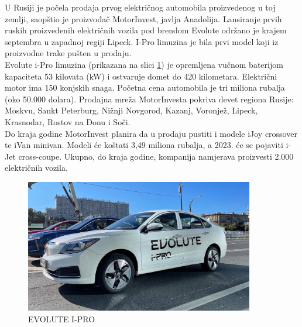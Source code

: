 \documentclass[a4paper]{article}
\begin{document}
    U Rusiji je počela prodaja prvog električnog automobila proizvedenog u toj zemlji, saopštio je proizvođač MotorInvest, javlja Anadolija. Lansiranje prvih ruskih proizvedenih električnih vozila pod brendom Evolute održano je krajem septembra u zapadnoj regiji Lipeck. I-Pro limuzina je bila prvi model koji iz proizvodne trake pušten u prodaju.\\
    Evolute i-Pro limuzina (prikazana na slici \ref{fig:IMG_EVOLUTE}) je opremljena vučnom baterijom kapaciteta 53 kilovata (kW) i ostvaruje domet do 420 kilometara. Električni motor ima 150 konjskih snaga.
    Početna cena automobila je tri miliona rubalja (oko 50.000 dolara). Prodajna mreža MotorInvesta pokriva devet regiona Rusije: Moskvu, Sankt Peterburg, Nižnji Novgorod, Kazanj, Voronjež, Lipeck, Krasnodar, Rostov na Donu i Soči.\\
    Do kraja godine MotorInvest planira da u prodaju pustiti i modele iJoy crossover te iVan minivan. Modeli će koštati 3,49 miliona rubalja, a 2023. će se pojaviti i-Jet cross-coupe. Ukupno, do kraja godine, kompanija namjerava proizvesti 2.000 električnih vozila.\\ 
    

    
    \begin{figure}[h]
        \centering
        \includegraphics[width=100mm,scale=0.5]{evoluteipro.jpg}
        \caption{EVOLUTE I-PRO}
        \label{fig:IMG_EVOLUTE}
        \end{figure}

\\
\end{document}
